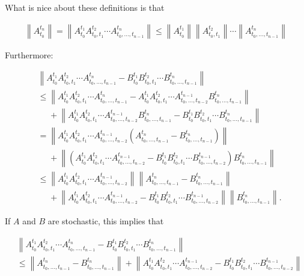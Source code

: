 \documentclass[a4paper,reqno]{amsart}
\newcommand{\norm}[1]{\left\lVert #1 \right\rVert}
\begin{document}
What is nice about these definitions is that

\begin{align*}
\norm{A^{t_n}_{t_0}}
=\norm{
	A_{t_0}^{t_1}
	A_{t_0,t_1}^{t_2}
	\cdots
	A_{t_0,\dots,t_{n-1}}^{t_n}
}
\leq
\norm{A_{t_0}^{t_1}}
	\norm{A_{t_0,t_1}^{t_2}}
	\cdots
	\norm{A_{t_0,\dots,t_{n-1}}^{t_n}}
\end{align*}

Furthermore:

\begin{align*}
&\norm{
	A_{t_0}^{t_1}
	A_{t_0,t_1}^{t_2}
	\cdots
	A_{t_0,\dots,t_{n-1}}^{t_n}
	-
	B_{t_0}^{t_1}
	B_{t_0,t_1}^{t_2}
	\cdots
	B_{t_0,\dots,t_{n-1}}^{t_n}
}\\
&\leq
\norm{
	A_{t_0}^{t_1}
	A_{t_0,t_1}^{t_2}
	\cdots
	A_{t_0,\dots,t_{n-1}}^{t_n}
	-
	A_{t_0}^{t_1}
	A_{t_0,t_1}^{t_2}
	\cdots
	A_{t_0,\dots,t_{n-2}}^{t_{n-1}}
	B_{t_0,\dots,t_{n-1}}^{t_n}}\\
	&~~~~~~+
	\norm{
	A_{t_0}^{t_1}
	A_{t_0,t_1}^{t_2}
	\cdots
	A_{t_0,\dots,t_{n-2}}^{t_{n-1}}
	B_{t_0,\dots,t_{n-1}}^{t_n}
	-
	B_{t_0}^{t_1}
	B_{t_0,t_1}^{t_2}
	\cdots
	B_{t_0,\dots,t_{n-1}}^{t_n}
}\\
&=
\norm{
	A_{t_0}^{t_1}
	A_{t_0,t_1}^{t_2}
	\cdots
	A_{t_0,\dots,t_{n-2}}^{t_{n-1}}
	(A_{t_0,\dots,t_{n-1}}^{t_n}-
	B_{t_0,\dots,t_{n-1}}^{t_n})
	}\\
	&~~~~~~+
	\norm{
	(A_{t_0}^{t_1}
	A_{t_0,t_1}^{t_2}
	\cdots
	A_{t_0,\dots,t_{n-2}}^{t_{n-1}}
	-
	B_{t_0}^{t_1}
	B_{t_0,t_1}^{t_2}
	\cdots
	B_{t_0,\dots,t_{n-2}}^{t_{n-1}})
	B_{t_0,\dots,t_{n-1}}^{t_n}
}\\
&\leq
\norm{
	A_{t_0}^{t_1}
	A_{t_0,t_1}^{t_2}
	\cdots
	A_{t_0,\dots,t_{n-2}}^{t_{n-1}}}
	\norm{A_{t_0,\dots,t_{n-1}}^{t_n}-
	B_{t_0,\dots,t_{n-1}}^{t_n}
	}\\
	&~~~~~~+
	\norm{
	A_{t_0}^{t_1}
	A_{t_0,t_1}^{t_2}
	\cdots
	A_{t_0,\dots,t_{n-2}}^{t_{n-1}}
	-
	B_{t_0}^{t_1}
	B_{t_0,t_1}^{t_2}
	\cdots
	B_{t_0,\dots,t_{n-2}}^{t_{n-1}}
	}
	\norm{
	B_{t_0,\dots,t_{n-1}}^{t_n}
}.
\end{align*}

If $A$ and $B$ are stochastic, this implies that

\begin{align*}
&\norm{
	A_{t_0}^{t_1}
	A_{t_0,t_1}^{t_2}
	\cdots
	A_{t_0,\dots,t_{n-1}}^{t_n}
	-
	B_{t_0}^{t_1}
	B_{t_0,t_1}^{t_2}
	\cdots
	B_{t_0,\dots,t_{n-1}}^{t_n}
}\\
&\leq
\norm{A_{t_0,\dots,t_{n-1}}^{t_n}-
	B_{t_0,\dots,t_{n-1}}^{t_n}
	}+
	\norm{
	A_{t_0}^{t_1}
	A_{t_0,t_1}^{t_2}
	\cdots
	A_{t_0,\dots,t_{n-2}}^{t_{n-1}}
	-
	B_{t_0}^{t_1}
	B_{t_0,t_1}^{t_2}
	\cdots
	B_{t_0,\dots,t_{n-2}}^{t_{n-1}}
	}
\end{align*}

 
%
\end{document}
